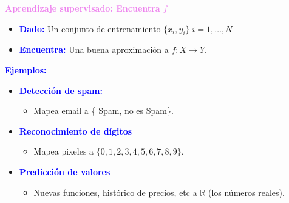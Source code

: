 \documentclass[11pt]{beamer}
\begin{document}
\begin{frame}{\textbf{\textcolor{violet}{Aprendizaje supervisado: Encuentra $f$}}}
	
\begin{itemize}
	\item \textbf{\textcolor{blue}{Dado:}} Un conjunto de entrenamiento $\{ x_i, y_i	\}|i = 1, \dots, N$
	\item \textbf{\textcolor{blue}{Encuentra:}} Una buena aproximaci\'on a $f: X \rightarrow Y$.
\end{itemize}

\vspace{0.3cm}

 \textbf{\textcolor{blue}{Ejemplos:}}
 
 \begin{itemize}
 	\item \textbf{\textcolor{blue}{Detecci\'on de spam:}}
 	\begin{itemize}
 		\item Mapea email a \{ Spam, no es Spam\}.
 	\end{itemize}
 	\item \textbf{\textcolor{blue}{Reconocimiento de d\'igitos}}
 	\begin{itemize}
 		\item  Mapea pixeles a $\{0,1, 2,3,4,5,6,7,8,9\}$.
 	\end{itemize}
 	\item \textbf{\textcolor{blue}{Predicci\'on de valores}}
 	\begin{itemize}
 		\item   Nuevas funciones, hist\'orico de precios, etc a $\mathbb{R}$ (los n\'umeros reales).
 	\end{itemize}
 \end{itemize}
\end{frame}
\end{document}
